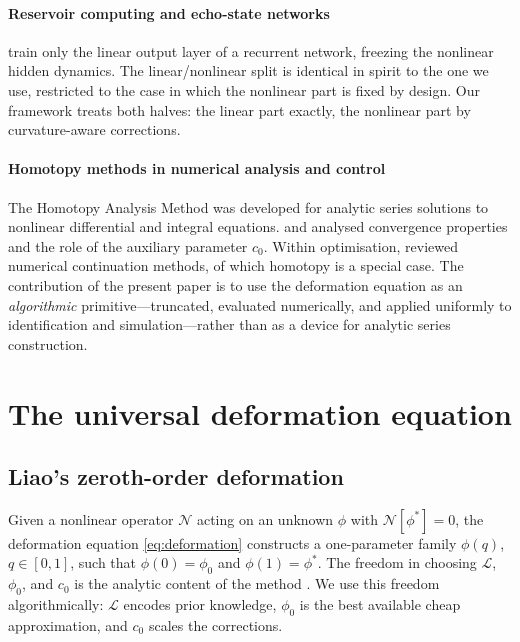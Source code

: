 \documentclass[preprint,12pt,numbers]{elsarticle}
\begin{document}
\paragraph{Reservoir computing and echo-state networks}
\citet{Lukosevicius2009} train only the linear output layer of a
recurrent network, freezing the nonlinear hidden dynamics. The
linear/nonlinear split is identical in spirit to the one we use,
restricted to the case in which the nonlinear part is fixed by design.
Our framework treats both halves: the linear part exactly, the nonlinear
part by curvature-aware corrections.

\paragraph{Homotopy methods in numerical analysis and control}
The Homotopy Analysis Method \cite{Liao2003,Liao2012} was developed for
analytic series solutions to nonlinear differential and integral
equations. \citet{Turkyilmazoglu2010} and \citet{VajraveluVanGorder2013}
analysed convergence properties and the role of the auxiliary parameter
$c_0$. Within optimisation, \citet{Allgower2003} reviewed numerical
continuation methods, of which homotopy is a special case. The
contribution of the present paper is to use the deformation equation as
an \emph{algorithmic} primitive---truncated, evaluated numerically, and
applied uniformly to identification and simulation---rather than as a
device for analytic series construction.


\section{The universal deformation equation}
\label{sec:universal}

\subsection{Liao's zeroth-order deformation}

Given a nonlinear operator $\mathcal{N}$ acting on an unknown $\phi$ with
$\mathcal{N}[\phi^*] = 0$, the deformation equation \eqref{eq:deformation}
constructs a one-parameter family $\phi(q)$, $q \in [0,1]$, such that
$\phi(0) = \phi_0$ and $\phi(1) = \phi^*$. The freedom in choosing
$\mathcal{L}$, $\phi_0$, and $c_0$ is the analytic content of the method
\cite{Liao2010}. We use this freedom algorithmically: $\mathcal{L}$
encodes prior knowledge, $\phi_0$ is the best available cheap
approximation, and $c_0$ scales the corrections.
\end{document}
